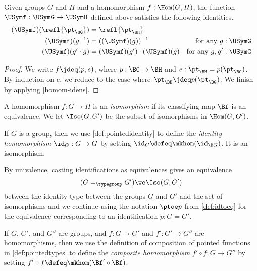 \begin{lemma}
  Given groups $G$ and $H$ and a homomorphism $f : \Hom(G,H)$, the function $\USymf : \USymG \to \USymH$ defined above satisfies
  the following identities.
  \begin{align}
    \label{gp-homo-unit} (\USymf) ( \refl {\pt_{\BG}} )
    &= \refl{\pt_{\BH}}                                                      \\
    \label{gp-homo-comp} (\USymf) (g ^ {-1})
    &= ((\USymf) (g))^{-1}                   & \text{for any $g : \USymG$} \\
    \label{gp-homo-inv}  (\USymf) (g' \cdot g)
    &=  (\USymf) (g') \cdot  (\USymf) (g) & \text{for any $g, g' : \USymG$}
  \end{align}
\end{lemma}

\begin{proof}
  We write $f \jdeq (p,e)$, where $p : \BG \to \BH$ and $e : \pt_{\BH} = p (\pt_{\BG})$.
  By induction on $e$, we reduce to the case where $\pt_{\BH} \jdeq p (\pt_{\BG})$.
  We finish by applying \cref{homom-idens}.
\end{proof}

\begin{definition}\label{def:groupisomorphism}
  A homomorphism $f : G\to H$ is an \emph{isomorphism} if its classifying map $\Bf$ is an equivalence.
  We let $\Iso(G,G')$ be the subset of isomorphisms in $\Hom(G, G')$.
\end{definition}

\begin{definition}\label{def:identity-group-homomorphism}
  If $G$ is a group, then we use \cref{def:pointedidentity} to define the \emph{identity homomorphism} $\id_G : G\to G$ by
  setting $\id_G \defeq \mkhom (\id_{\B G})$.  It is an isomorphism.
\end{definition}
\begin{remark}
  \label{remark:groupsasunivalenttype}By univalence, casting identifications as equivalences gives an equivalence
  $$(G=_\typegroup G')\we \Iso(G,G')$$
  between the identity type between the groups $G$ and $G'$ and the set of isomorphisms
  and we continue using the notation $\ptoe p$ from \cref{def:idtoeq} for the equivalence corresponding to an identification $p:G=G'$.
\end{remark}


\begin{definition}\label{def:group-homomorphism-composition}
  If $G$, $G'$, and $G''$ are groups, and $f : G\to G'$ and $f' : G'\to G''$ are homomorphisms, then we use
  the definition of composition of pointed functions in \cref{def:pointedtypes} to define the \emph{composite homomorphism}
  $f' \circ f : G \to G''$ by setting $f' \circ f \defeq \mkhom (\Bf' \circ \Bf)$.
\end{definition}

